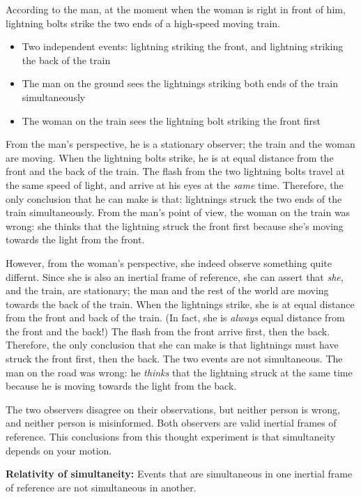 According to the man, at the moment when the woman is right in front of him,
lightning bolts strike the two ends of a high-speed moving train.
\begin{itemize}
\item Two independent events: lightning striking the front, and lightning
  striking the back of the train
\item The man on the ground sees the lightnings striking both ends of the
  train simultaneously
\item The woman on the train sees the lightning bolt striking the front first
\end{itemize}




From the man's perspective, he is a stationary observer; the train and the
woman are moving. When the lightning bolts strike, he is at equal distance from
the front and the back of the train. The flash from the two lightning bolts
travel at the same speed of light, and arrive at his eyes at the \emph{same}
time. Therefore, the only conclusion that he can make is that: lightnings
struck the two ends of the train simultaneously. From the man's point of view,
the woman on the train was wrong: she thinks that the lightning struck the
front first because she's moving towards the light from the front.

However, from the woman's perspective, she indeed observe something quite
differnt. Since she is also an inertial frame of reference, she can assert that
\emph{she}, and the train, are stationary; the man and the rest of the world
are moving towards the back of the train. When the lightnings strike, she is at
equal distance from the front and back of the train. (In fact, she is
\emph{always} equal distance from the front and the back!) The flash from the
front arrive first, then the back. Therefore, the only conclusion that she can
make is that lightnings must have struck the front first, then the back. The
two events are not simultaneous. The man on the road was wrong: he
\emph{thinks} that the lightning struck at the same time because he is moving
towards the light from the back.

The two observers disagree on their observations, but neither person is wrong,
and neither person is misinformed. Both observers are valid inertial frames of
reference. This conclusions from this thought experiment is that simultaneity
depends on your motion.
\begin{definition}
  \textbf{Relativity of simultaneity:} Events that are simultaneous in one
  inertial frame of reference are not simultaneous in another.
\end{definition}


